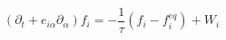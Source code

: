 \documentclass[12pt]{article}
\begin{document}
$$ 
\left(\partial_t + e_{i\alpha}\partial_{\alpha}\right)f_i = -\frac{1}{\tau}\left(f_i - f_i^{eq}\right) + W_i
$$
\end{document}
